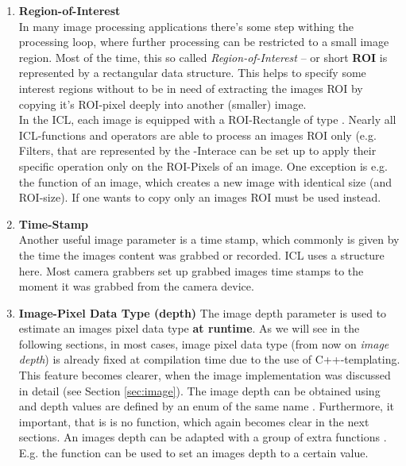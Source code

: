 \begin{enumerate}
\item \textbf{Region-of-Interest}\\
In many image processing applications there's some step withing the processing loop, where further processing can be restricted to a small image region. Most of the time, this so called \emph{Region-of-Interest} -- or short \textbf{ROI} is represented by a rectangular data structure. This helps to specify some interest regions without to be in need of extracting the images ROI by copying it's ROI-pixel deeply into another (smaller) image.\\
In the ICL, each image is equipped with a ROI-Rectangle of type  . Nearly all ICL-functions and operators are able to process an images ROI only (e.g. Filters, that are represented by the -Interace  can be set up to apply their specific operation only on the ROI-Pixels of an image. One exception is e.g. the  function of an image, which creates a new image with
identical size (and ROI-size). If one wants to copy only an images ROI  must be used instead. 

\item \textbf{Time-Stamp}\\
Another useful image parameter is a time stamp, which commonly is given by the time the images content was grabbed or recorded. ICL uses a   structure here. Most camera grabbers set up grabbed images time stamps to the moment it was grabbed from the camera device.  

\item \textbf{Image-Pixel Data Type (depth)}
The image depth parameter is used to estimate an images pixel data type \textbf{at runtime}. As we will see in the following sections, in most cases, image pixel data type (from now on \emph{image depth}) is already fixed at compilation time due to the use of C++-templating. This feature becomes clearer, when the image implementation was discussed in detail (see Section \ref{sec:image}). The image depth can be obtained using  and depth values are defined by an enum of the same name . Furthermore, it important, that is is no  function, which again becomes clear in the next sections. An images depth can be adapted with a group of extra functions . E.g. the function   can be used to set an images depth to a certain value. 

\end{enumerate}

